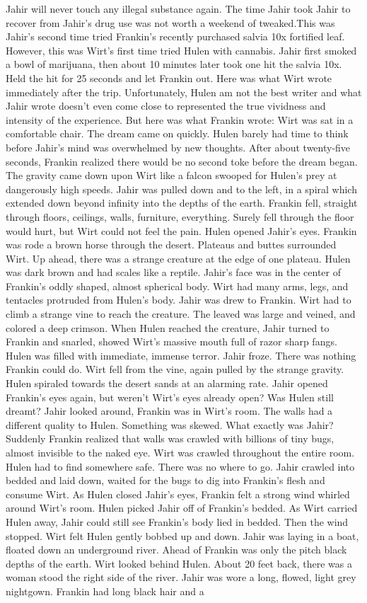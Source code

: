 \documentclass[12pt]{book}
\begin{document}
Jahir will never touch any illegal substance again. The time Jahir took Jahir to recover from Jahir's drug use was not worth a weekend of tweaked.This was Jahir's second time tried Frankin's recently purchased salvia 10x fortified leaf. However, this was Wirt's first time tried Hulen with cannabis. Jahir first smoked a bowl of marijuana, then about 10 minutes later took one hit the salvia 10x. Held the hit for 25 seconds and let Frankin out. Here was what Wirt wrote immediately after the trip. Unfortunately, Hulen am not the best writer and what Jahir wrote doesn't even come close to represented the true vividness and intensity of the experience. But here was what Frankin wrote: Wirt was sat in a comfortable chair. The dream came on quickly. Hulen barely had time to think before Jahir's mind was overwhelmed by new thoughts. After about twenty-five seconds, Frankin realized there would be no second toke before the dream began. The gravity came down upon Wirt like a falcon swooped for Hulen's prey at dangerously high speeds. Jahir was pulled down and to the left, in a spiral which extended down beyond infinity into the depths of the earth. Frankin fell, straight through floors, ceilings, walls, furniture, everything. Surely fell through the floor would hurt, but Wirt could not feel the pain. Hulen opened Jahir's eyes. Frankin was rode a brown horse through the desert. Plateaus and buttes surrounded Wirt. Up ahead, there was a strange creature at the edge of one plateau. Hulen was dark brown and had scales like a reptile. Jahir's face was in the center of Frankin's oddly shaped, almost spherical body. Wirt had many arms, legs, and tentacles protruded from Hulen's body. Jahir was drew to Frankin. Wirt had to climb a strange vine to reach the creature. The leaved was large and veined, and colored a deep crimson. When Hulen reached the creature, Jahir turned to Frankin and snarled, showed Wirt's massive mouth full of razor sharp fangs. Hulen was filled with immediate, immense terror. Jahir froze. There was nothing Frankin could do. Wirt fell from the vine, again pulled by the strange gravity. Hulen spiraled towards the desert sands at an alarming rate. Jahir opened Frankin's eyes again, but weren't Wirt's eyes already open? Was Hulen still dreamt? Jahir looked around, Frankin was in Wirt's room. The walls had a different quality to Hulen. Something was skewed. What exactly was Jahir? Suddenly Frankin realized that walls was crawled with billions of tiny bugs, almost invisible to the naked eye. Wirt was crawled throughout the entire room. Hulen had to find somewhere safe. There was no where to go. Jahir crawled into bedded and laid down, waited for the bugs to dig into Frankin's flesh and consume Wirt. As Hulen closed Jahir's eyes, Frankin felt a strong wind whirled around Wirt's room. Hulen picked Jahir off of Frankin's bedded. As Wirt carried Hulen away, Jahir could still see Frankin's body lied in bedded. Then the wind stopped. Wirt felt Hulen gently bobbed up and down. Jahir was laying in a boat, floated down an underground river. Ahead of Frankin was only the pitch black depths of the earth. Wirt looked behind Hulen. About 20 feet back, there was a woman stood the right side of the river. Jahir was wore a long, flowed, light grey nightgown. Frankin had long black hair and a 
\end{document}
